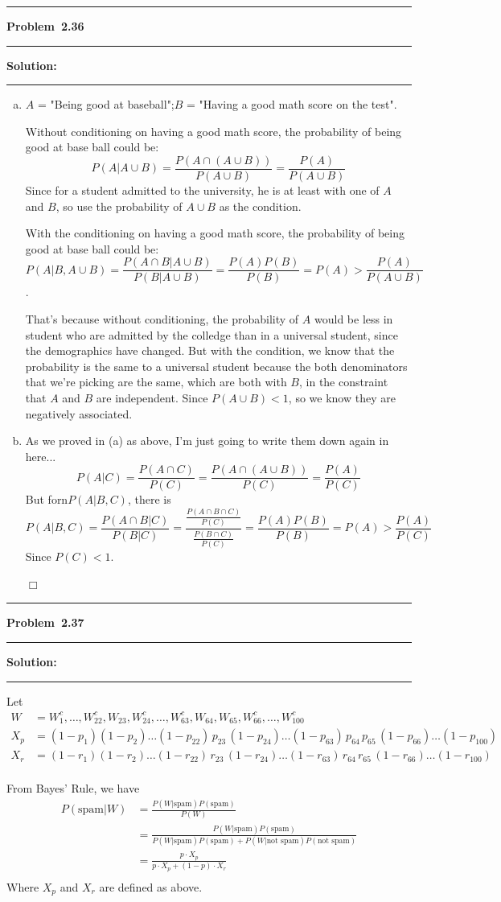 \documentclass[10.5pt]{article}
\newcommand\question[1]{\vspace{.2in}\hrule\vspace{0.04in}\textbf{Problem\ #1}\vspace{.4em}\hrule\vspace{.10in}}
\newcommand\Solution{\vspace{.3in}\textbf{Solution:}\vspace{.5em}\hrule\vspace{.08in}\par}
\begin{document}
\question{2.36}
\Solution{}
\begin{enumerate}[(a)]
	\item $A$ = "Being good at baseball";\quad $B$ = "Having a good math score on the test".
	
	Without conditioning on having a good math score, the probability of being good at base ball could be:
	$$P(A|A\cup B) = \frac{P(A\cap(A\cup B))}{P(A\cup B)} = \frac{P(A)}{P(A\cup B)}$$
	Since for a student admitted to the university, he is at least with one of $A$ and $B$, so use the probability of $A\cup B$ as the condition.

	With the conditioning on having a good math score, the probability of being good at base ball could be:
	$$P(A|B, A\cup B) = \frac{P(A\cap B|A\cup B)}{P(B|A\cup B)} = \frac{P(A)P(B)}{P(B)}=P(A)>\frac{P(A)}{P(A\cup B)}$$.

	That's because without conditioning, the probability of $A$ would be less in student who are admitted by the colledge than in a universal student, since the demographics have changed.
	But with the condition, we know that the probability is the same to a universal student because the both denominators that we're picking are the same, which are both with $B$, in the constraint that $A$ and $B$ are independent.  
	Since $P(A\cup B)<1$, so we know they are negatively associated.
	\vspace{2cm}
	\item As we proved in (a) as above, I'm just going to write them down again in here...
	$$P(A|C) = \frac{P(A\cap C)}{P(C)} = \frac{P(A\cap(A\cup B))}{P(C)} = \frac{P(A)}{P(C)}$$
	But forn$P(A|B, C)$, there is
	$$P(A|B, C) = \frac{P(A\cap B|C)}{P(B|C)} = \frac{\frac{P(A\cap B\cap C)}{P(C)}}{\frac{P(B\cap C)}{P(C)}}=\frac{P(A)P(B)}{P(B)}=P(A)>\frac{P(A)}{P(C)}$$
	Since $P(C)<1$.

	$\Box$

\end{enumerate}


\pagebreak

\question{2.37}
\Solution{}
Let
\begin{align*}
	W &= W_1^c,\dots,W_{22}^c,W_{23},W_{24}^c,\dots,W_{63}^c,W_{64},W_{65},W_{66}^c,\dots,W_{100}^c\\[8pt]
	X_p &= (1-p_1)(1-p_2)\dots (1-p_{22})\,p_{23}\,(1-p_{24})\dots(1-p_{63})\,p_{64}\,p_{65}\,(1-p_{66})\dots(1-p_{100})\\[8pt]
	X_r &= (1-r_1)(1-r_2)\dots (1-r_{22})\,r_{23}\,(1-r_{24})\dots(1-r_{63})\,r_{64}\,r_{65}\,(1-r_{66})\dots(1-r_{100})\\[8pt]
\end{align*}

From Bayes' Rule, we have
\begin{align*}
	P(\text{spam}|W) 
	&= \frac{P(W|\text{spam})P(\text{spam})}{P(W)}\\[8pt]
	&= \frac{P(W|\text{spam})P(\text{spam})}{P(W|\text{spam})P(\text{spam})+P(W|\text{not spam})P(\text{not spam})}\\[8pt]
	&= \frac{p\cdot X_p}{p\cdot X_p+(1-p)\cdot X_r}\\[8pt]
\end{align*}
Where $X_p$ and $X_r$ are defined as above.
\end{document}
